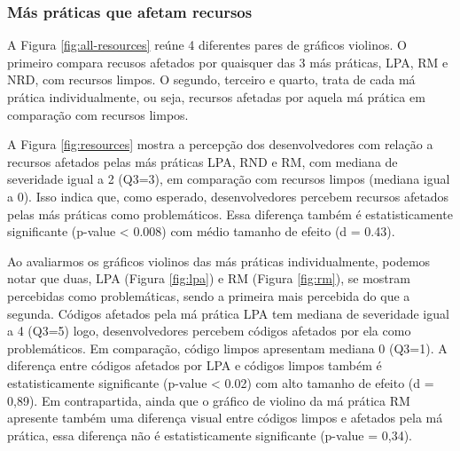 
\subsubsection{Más práticas que afetam recursos}

A Figura \ref{fig:all-resources} reúne 4 diferentes pares de gráficos violinos. O primeiro compara recusos afetados por quaisquer das 3 más práticas, LPA, RM e NRD, com recursos limpos. O segundo, terceiro e quarto, trata de cada má prática individualmente, ou seja, recursos afetadas por aquela má prática em comparação com recursos limpos. 

A Figura \ref{fig:resources} mostra a percepção dos desenvolvedores com relação a recursos afetados pelas más práticas LPA, RND e RM, com mediana de severidade igual a 2 (Q3=3), em comparação com recursos limpos (mediana igual a 0). Isso indica que, como esperado, desenvolvedores percebem recursos afetados pelas más práticas como problemáticos. Essa diferença também é estatisticamente significante (p-value < 0.008) com médio tamanho de efeito (d = 0.43).


Ao avaliarmos os gráficos violinos das más práticas individualmente, podemos notar que duas, LPA (Figura \ref{fig:lpa}) e RM (Figura \ref{fig:rm}), se mostram percebidas como problemáticas, sendo a primeira mais percebida do que a segunda. Códigos afetados pela má prática LPA tem mediana de severidade igual a 4 (Q3=5) logo, desenvolvedores percebem códigos afetados por ela como problemáticos. Em comparação, código limpos apresentam mediana 0 (Q3=1). A diferença entre códigos afetados por LPA e códigos limpos também é estatisticamente significante (p-value < 0.02) com alto tamanho de efeito (d = 0,89). Em contrapartida, ainda que o gráfico de violino da má prática RM apresente também uma diferença visual entre códigos limpos e afetados pela má prática, essa diferença não é estatisticamente significante (p-value = 0,34).


